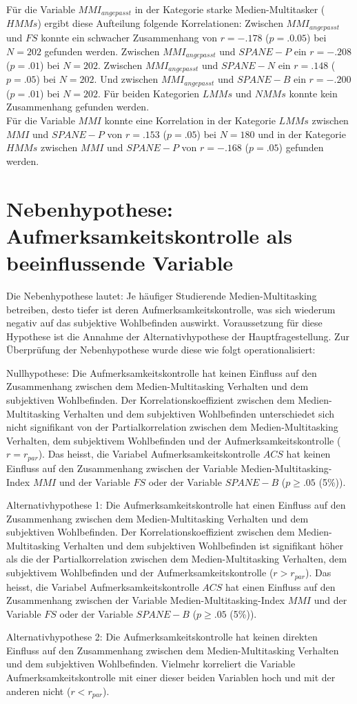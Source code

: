 Für die Variable $MMI_{angepasst}$ in der Kategorie starke Medien-Multitasker ($HMMs$) ergibt diese Aufteilung folgende Korrelationen: Zwischen $MMI_{angepasst}$ und $FS$ konnte ein schwacher Zusammenhang von $r=-.178$ ($p=.0.05$) bei $N=202$ gefunden werden. Zwischen $MMI_{angepasst}$ und $SPANE-P$ ein $r=-.208$ ($p=.01$) bei $N=202$. Zwischen $MMI_{angepasst}$ und $SPANE-N$ ein $r=.148$ ($p=.05$) bei $N=202$. Und zwischen $MMI_{angepasst}$ und $SPANE-B$ ein $r=-.200$ ($p=.01$) bei $N=202$. Für beiden Kategorien $LMMs$ und $NMMs$ konnte kein Zusammenhang gefunden werden.\\
Für die Variable $MMI$ konnte eine Korrelation in der Kategorie $LMMs$ zwischen $MMI$ und $SPANE-P$ von $r=.153$ ($p=.05$) bei $N=180$ und in der Kategorie $HMMs$ zwischen $MMI$ und $SPANE-P$ von $r=-.168$ ($p=.05$) gefunden werden.
\section{Nebenhypothese: Aufmerksamkeitskontrolle als beeinflussende Variable}\label{label.nebenhypothese}
Die Nebenhypothese lautet: Je häufiger Studierende Medien-Multitasking betreiben, desto tiefer ist deren Aufmerksamkeitskontrolle, was sich wiederum negativ auf das subjektive Wohlbefinden auswirkt. Voraussetzung für diese Hypothese ist die Annahme der Alternativhypothese der Hauptfragestellung. Zur Überprüfung der Nebenhypothese wurde diese wie folgt operationalisiert:\par
Nullhypothese: Die Aufmerksamkeitskontrolle hat keinen Einfluss auf den Zusammenhang zwischen dem Medien-Multitasking Verhalten und dem subjektiven Wohlbefinden. Der Korrelationskoeffizient zwischen dem Medien-Multitasking Verhalten und dem subjektiven Wohlbefinden unterschiedet sich nicht signifikant von der Partialkorrelation zwischen dem Medien-Multitasking Verhalten, dem subjektivem Wohlbefinden und der Aufmerksamkeitskontrolle ($r=r_{par}$). Das heisst, die Variabel Aufmerksamkeitskontrolle $ACS$ hat keinen Einfluss auf den Zusammenhang zwischen der Variable Medien-Multitasking-Index $MMI$ und der Variable $FS$ oder der Variable $SPANE-B$ ($p \geq .05$ (5\%)). 
\par
Alternativhypothese 1: Die Aufmerksamkeitskontrolle hat einen Einfluss auf den Zusammenhang zwischen dem Medien-Multitasking Verhalten und dem subjektiven Wohlbefinden. Der Korrelationskoeffizient zwischen dem Medien-Multitasking Verhalten und dem subjektiven Wohlbefinden ist signifikant höher als die der Partialkorrelation zwischen dem Medien-Multitasking Verhalten, dem subjektivem Wohlbefinden und der Aufmerksamkeitskontrolle ($r>r_{par}$). Das heisst, die Variabel Aufmerksamkeitskontrolle $ACS$ hat einen Einfluss auf den Zusammenhang zwischen der Variable Medien-Multitasking-Index $MMI$ und der Variable $FS$ oder der Variable $SPANE-B$ ($p \geq .05$ (5\%)). \par
Alternativhypothese 2: Die Aufmerksamkeitskontrolle hat keinen direkten Einfluss auf den Zusammenhang zwischen dem Medien-Multitasking Verhalten und dem subjektiven Wohlbefinden. 
Vielmehr korreliert die Variable Aufmerksamkeitskontrolle mit einer dieser beiden Variablen hoch und mit der anderen nicht ($r<r_{par}$). 
